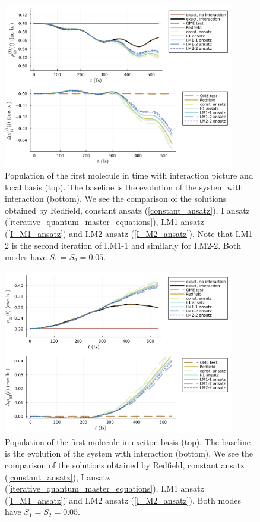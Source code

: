 \newpage
\begin{figure}[H]
\centering
\includegraphics[width=0.9\textwidth]{img/ansatz/iterative03_joined_intloc22.png}
\caption{Population of the first molecule in time with interaction picture and local basis (top). The baseline is the evolution of the system with interaction (bottom). We see the comparison of the solutions obtained by Redfield, constant ansatz (\ref{constant_ansatz}), I ansatz (\ref{iterative_quantum_master_equations}), I.M1 ansatz (\ref{I_M1_ansatz}) and I.M2 ansatz (\ref{I_M2_ansatz}). Note that I.M1-2 is the second iteration of I.M1-1 and similarly for I.M2-2. Both modes have $S_1=S_2=0.05$. }
\label{img:iterative03_joined_intloc22}
\end{figure}

\begin{figure}[H]
\centering
\includegraphics[width=0.9\textwidth]{img/ansatz/iterative03_joined_schexc22.png}
\caption{Population of the first molecule in exciton basis (top). The baseline is the evolution of the system with interaction (bottom). We see the comparison of the solutions obtained by Redfield, constant ansatz (\ref{constant_ansatz}), I ansatz (\ref{iterative_quantum_master_equations}), I.M1 ansatz (\ref{I_M1_ansatz}) and I.M2 ansatz (\ref{I_M2_ansatz}). Both modes have $S_1=S_2=0.05$. }
\label{img:iterative03_joined_schexc22}
\end{figure}

